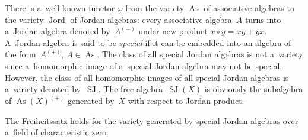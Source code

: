 \documentclass[pdftex]{sigma}
\begin{document}
There is a~well-known functor $\omega $ from the variety $\operatorname{As}$ of associative algebras to the variety $\operatorname{Jord}$ of Jordan
algebras: every associative algebra~$A$ turns into a~Jordan algebra denoted by~$A^{(+)}$ under new product $x\circ y=xy + yx$.
A~Jordan algebra is said to be {\em special} if it can be embedded into an algebra of the form~$A^{(+)}$, $A\in \operatorname{As}$.
The class of all special Jordan algebras is not a~variety since a~homomorphic image of a~special Jordan algebra may not be special.
However, the class of all homomorphic images of all special Jordan algebras is a~variety denoted by~$\operatorname{SJ}$.
The free algebra~$\operatorname{SJ}(X)$ is obviously the subalgebra of $\operatorname{As}(X)^{(+)}$ generated by~$X$ with respect to Jordan product.

\begin{corollary}
The Freiheitssatz holds for the variety generated by special Jordan algebras over a~field of characteristic zero.
\end{corollary}
\end{document}
